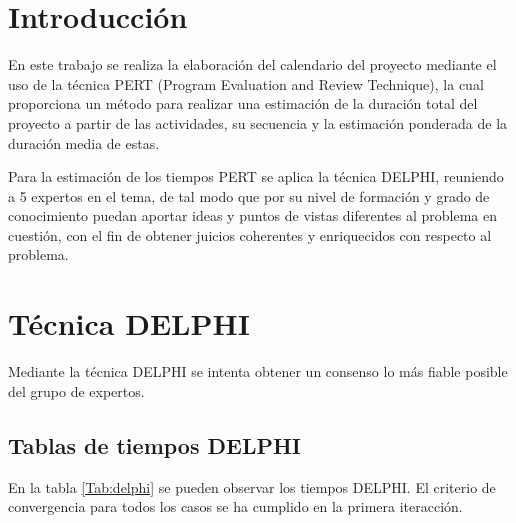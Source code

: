 \documentclass[11pt,a4paper,spanish,twoside]{report}
\begin{document}
\tableofcontents


\chapter*{Introducción}
En este trabajo se realiza la elaboración del calendario del proyecto
mediante el uso de la técnica PERT (Program Evaluation and Review Technique),
la cual proporciona un método para realizar una estimación de la duración
total del proyecto a partir de las actividades, su secuencia y la estimación
ponderada de la duración media de estas. 

Para la estimación de los tiempos PERT se aplica la técnica DELPHI, reuniendo
a 5 expertos en el tema, de tal modo que por su nivel de formación y grado de
conocimiento puedan aportar ideas y puntos de vistas diferentes al problema
en cuestión, con el fin de obtener juicios coherentes y enriquecidos con
respecto al problema. 
\chapter{Técnica DELPHI}
Mediante la técnica DELPHI se intenta obtener un consenso lo más fiable
posible del grupo de expertos.
\section{Tablas de tiempos DELPHI}
En la tabla \ref{Tab:delphi} se pueden observar los tiempos DELPHI. El
criterio de convergencia para todos los casos se ha cumplido en la primera
iteracción.
\end{document}
